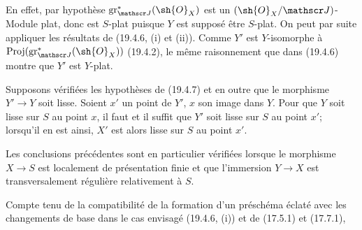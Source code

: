 En effet, par hypothèse $\operatorname{gr}_{\mathscr J}^*(\sh{O}_X)$ est un $(\sh{O}_X/\mathscr J)$-Module plat, donc est $S$-plat puisque $Y$ est supposé être $S$-plat. On peut par suite appliquer les résultats de (19.4.6, (i) et (ii)). Comme $Y'$ est $Y$-isomorphe à $\operatorname{Proj}(\operatorname{gr}_{\mathscr J}^*(\sh{O}_X))$ (19.4.2), le même raisonnement que dans (19.4.6) montre que $Y'$ est $Y$-plat.

\begin{proposition}[19.4.8]
\label{IV.19.4.8}
Supposons vérifiées les hypothèses de (19.4.7) et en outre que le morphisme $Y'\to Y$ soit lisse. Soient $x'$ un point de $Y'$, $x$ son image dans $Y$. Pour que $Y$ soit lisse sur $S$ au point $x$, il faut et il suffit que $Y'$ soit lisse sur $S$ au point $x'$; lorsqu'il en est ainsi, $X'$ est alors lisse sur $S$ au point $x'$.

Les conclusions précédentes sont en particulier vérifiées lorsque le morphisme $X\to S$ est localement de présentation finie et que l'immersion $Y\to X$ est transversalement régulière relativement à $S$.
\end{proposition}

Compte tenu de la compatibilité de la formation d'un préschéma éclaté avec les changements de base dans le cas envisagé (19.4.6, (i)) et de (17.5.1) et (17.7.1),

